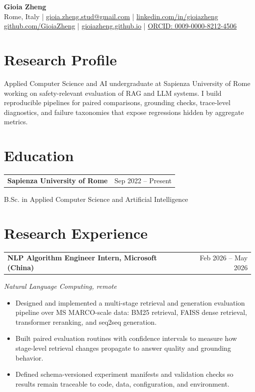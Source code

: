 \documentclass[10pt,a4paper]{article}
\makeatletter
\newcommand{\entry}[2]{
  \vspace{2pt}
  \begin{tabular*}{\textwidth}{@{}l@{\extracolsep{\fill}}r@{}}
    \textbf{#1} & #2 \\
  \end{tabular*}
}
\newcommand{\subentry}[1]{\textit{#1}\vspace{-1pt}}
\makeatother
\begin{document}
\begin{center}
{\LARGE \textbf{Gioia Zheng}} \\[3pt]
Rome, Italy \quad | \quad
\href{mailto:gioia.zheng.stud@gmail.com}{gioia.zheng.stud@gmail.com} \quad | \quad
\href{https://www.linkedin.com/in/gioiazheng/}{linkedin.com/in/gioiazheng} \\[2pt]
\href{https://github.com/GioiaZheng}{github.com/GioiaZheng} \quad | \quad
\href{https://gioiazheng.github.io}{gioiazheng.github.io} \quad | \quad
\href{https://orcid.org/0009-0000-8212-4506}{ORCID: 0009-0000-8212-4506}
\end{center}

\vspace{-5pt}

\section*{Research Profile}
Applied Computer Science and AI undergraduate at Sapienza University of Rome working on safety-relevant evaluation of RAG and LLM systems. I build reproducible pipelines for paired comparisons, grounding checks, trace-level diagnostics, and failure taxonomies that expose regressions hidden by aggregate metrics.

\section*{Education}
\entry{Sapienza University of Rome}{Sep 2022 -- Present}
B.Sc. in Applied Computer Science and Artificial Intelligence

\section*{Research Experience}
\entry{NLP Algorithm Engineer Intern, Microsoft (China)}{Feb 2026 -- May 2026}
\subentry{Natural Language Computing, remote}
\begin{itemize}
\item Designed and implemented a multi-stage retrieval and generation evaluation pipeline over MS MARCO-scale data: BM25 retrieval, FAISS dense retrieval, transformer reranking, and seq2seq generation.
\item Built paired evaluation routines with confidence intervals to measure how stage-level retrieval changes propagate to answer quality and grounding behavior.
\item Defined schema-versioned experiment manifests and validation checks so results remain traceable to code, data, configuration, and environment.
\end{itemize}
\end{document}

